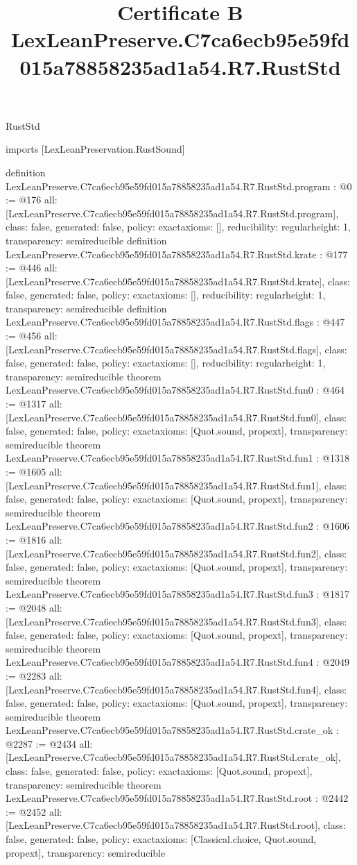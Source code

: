 \begin{lexlean}{RustStd}
\title{Certificate B LexLeanPreserve.C7ca6ecb95e59fd015a78858235ad1a54.R7.RustStd}
\begin{coremodule}
imports [LexLeanPreservation.RustSound]

definition LexLeanPreserve.C7ca6ecb95e59fd015a78858235ad1a54.R7.RustStd.program : @0 := @176 {
  all: [LexLeanPreserve.C7ca6ecb95e59fd015a78858235ad1a54.R7.RustStd.program],
  class: false,
  generated: false,
  policy: exact{axioms: []},
  reducibility: regular{height: 1},
  transparency: semireducible
}
definition LexLeanPreserve.C7ca6ecb95e59fd015a78858235ad1a54.R7.RustStd.krate : @177 := @446 {
  all: [LexLeanPreserve.C7ca6ecb95e59fd015a78858235ad1a54.R7.RustStd.krate],
  class: false,
  generated: false,
  policy: exact{axioms: []},
  reducibility: regular{height: 1},
  transparency: semireducible
}
definition LexLeanPreserve.C7ca6ecb95e59fd015a78858235ad1a54.R7.RustStd.flags : @447 := @456 {
  all: [LexLeanPreserve.C7ca6ecb95e59fd015a78858235ad1a54.R7.RustStd.flags],
  class: false,
  generated: false,
  policy: exact{axioms: []},
  reducibility: regular{height: 1},
  transparency: semireducible
}
theorem LexLeanPreserve.C7ca6ecb95e59fd015a78858235ad1a54.R7.RustStd.fun0 : @464 := @1317 {
  all: [LexLeanPreserve.C7ca6ecb95e59fd015a78858235ad1a54.R7.RustStd.fun0],
  class: false,
  generated: false,
  policy: exact{axioms: [Quot.sound, propext]},
  transparency: semireducible
}
theorem LexLeanPreserve.C7ca6ecb95e59fd015a78858235ad1a54.R7.RustStd.fun1 : @1318 := @1605 {
  all: [LexLeanPreserve.C7ca6ecb95e59fd015a78858235ad1a54.R7.RustStd.fun1],
  class: false,
  generated: false,
  policy: exact{axioms: [Quot.sound, propext]},
  transparency: semireducible
}
theorem LexLeanPreserve.C7ca6ecb95e59fd015a78858235ad1a54.R7.RustStd.fun2 : @1606 := @1816 {
  all: [LexLeanPreserve.C7ca6ecb95e59fd015a78858235ad1a54.R7.RustStd.fun2],
  class: false,
  generated: false,
  policy: exact{axioms: [Quot.sound, propext]},
  transparency: semireducible
}
theorem LexLeanPreserve.C7ca6ecb95e59fd015a78858235ad1a54.R7.RustStd.fun3 : @1817 := @2048 {
  all: [LexLeanPreserve.C7ca6ecb95e59fd015a78858235ad1a54.R7.RustStd.fun3],
  class: false,
  generated: false,
  policy: exact{axioms: [Quot.sound, propext]},
  transparency: semireducible
}
theorem LexLeanPreserve.C7ca6ecb95e59fd015a78858235ad1a54.R7.RustStd.fun4 : @2049 := @2283 {
  all: [LexLeanPreserve.C7ca6ecb95e59fd015a78858235ad1a54.R7.RustStd.fun4],
  class: false,
  generated: false,
  policy: exact{axioms: [Quot.sound, propext]},
  transparency: semireducible
}
theorem LexLeanPreserve.C7ca6ecb95e59fd015a78858235ad1a54.R7.RustStd.crate_ok : @2287 := @2434 {
  all: [LexLeanPreserve.C7ca6ecb95e59fd015a78858235ad1a54.R7.RustStd.crate_ok],
  class: false,
  generated: false,
  policy: exact{axioms: [Quot.sound, propext]},
  transparency: semireducible
}
theorem LexLeanPreserve.C7ca6ecb95e59fd015a78858235ad1a54.R7.RustStd.root : @2442 := @2452 {
  all: [LexLeanPreserve.C7ca6ecb95e59fd015a78858235ad1a54.R7.RustStd.root],
  class: false,
  generated: false,
  policy: exact{axioms: [Classical.choice, Quot.sound, propext]},
  transparency: semireducible
}


\end{coremodule}
\end{lexlean}
